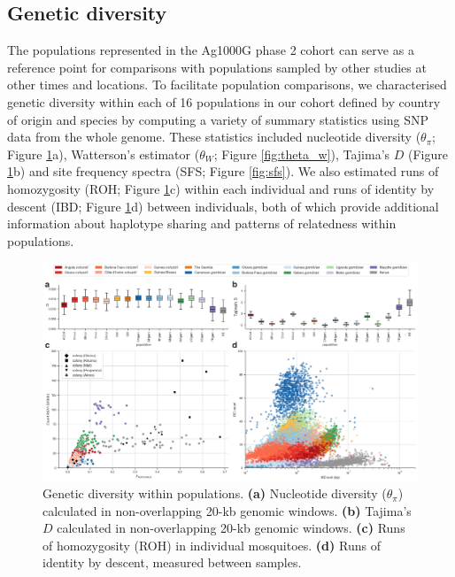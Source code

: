 \documentclass[a4paper,11pt,abstracton,hidelinks]{scrartcl}
\begin{document}
\subsection*{Genetic diversity}


%
The populations represented in the Ag1000G phase 2 cohort can serve as a reference point for comparisons with populations sampled by other studies at other times and locations. 
%
To facilitate population comparisons, we characterised genetic diversity within each of 16 populations in our cohort defined by country of origin and species by computing a variety of summary statistics using SNP data from the whole genome.
%
These statistics included nucleotide diversity ($\theta_{\pi}$; Figure \ref{fig:diversity}a), Watterson's estimator ($\theta_{W}$; Figure \ref{fig:theta_w}), Tajima's $D$ (Figure \ref{fig:diversity}b) and site frequency spectra (SFS; Figure \ref{fig:sfs}). 
%
We also estimated runs of homozygosity (ROH; Figure \ref{fig:diversity}c) within each individual and runs of identity by descent (IBD; Figure \ref{fig:diversity}d) between individuals, both of which provide additional information about haplotype sharing and patterns of relatedness within populations. 


\begin{figure}[H]
	\begin{center}
		\includegraphics*[width=6.3in]{artwork/diversity_composite.jpeg}
	\end{center}
	\caption{Genetic diversity within populations. \textbf{(a)} Nucleotide diversity ($\theta_{\pi}$) calculated in non-overlapping 20-kb genomic windows. \textbf{(b)} Tajima's $D$ calculated in non-overlapping 20-kb genomic windows. \textbf{(c)} Runs of homozygosity
(ROH) in individual mosquitoes. \textbf{(d)} Runs of identity by descent, measured between samples.}
	\label{fig:diversity}
\end{figure}
\end{document}
